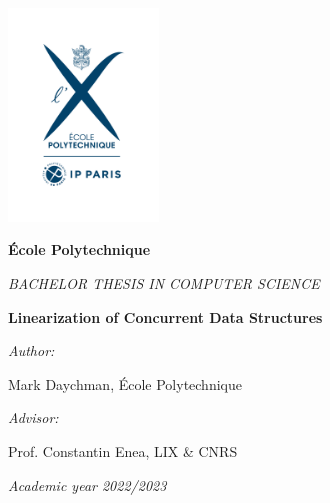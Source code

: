 \documentclass[oneside, a4paper, onecolumn, 10pt]{article}
\newcommand{\thesistitle}[0]{Linearization of Concurrent Data Structures}
\newcommand{\authorname}[0]{Mark Daychman}
\newcommand{\supervisor}[0]{Prof. Constantin Enea}
\newcommand{\supervisorinstitution}[0]{LIX \& CNRS}
\begin{document}



\hspace{0pt}
\vfill

\begin{center}

  \includegraphics[width=0.3\textwidth]{logo-EP-vertical}

  \vspace*{2em}
  {\large
    \textbf{\'Ecole Polytechnique}

    \vspace*{1em}
    \textit{BACHELOR THESIS IN COMPUTER SCIENCE}


    \vspace*{3em}
    {\Huge \textbf{\thesistitle}}
    \vspace*{3em}



    \textit{Author:}

    \vspace*{1em}
    \authorname{}, \'Ecole Polytechnique

    \vspace*{2em}
    {\textit{Advisor:}}

    \vspace*{1em}
    \supervisor{}, \supervisorinstitution{}
  }

  \vspace*{2em}
  \textit{Academic year 2022/2023}

\end{center}
\end{document}
